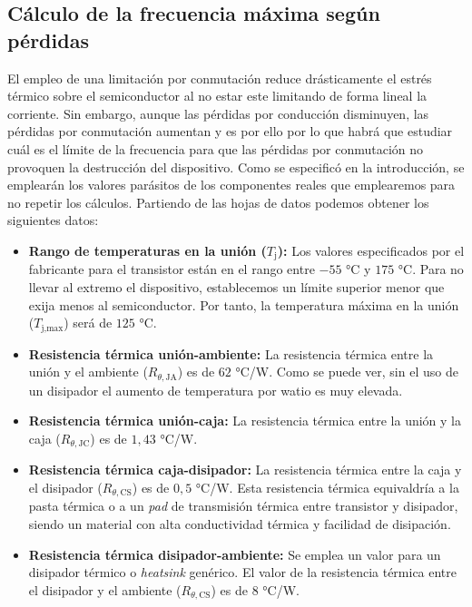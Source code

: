\documentclass[12pt]{report} %
\begin{document}
\subsection{Cálculo de la frecuencia máxima según pérdidas}
El empleo de una limitación por conmutación reduce drásticamente el estrés térmico sobre el semiconductor al no estar este limitando de forma lineal la corriente. Sin embargo, aunque las pérdidas por conducción disminuyen, las pérdidas por conmutación aumentan y es por ello por lo que habrá que estudiar cuál es el límite de la frecuencia para que las pérdidas por conmutación no provoquen la destrucción del dispositivo. Como se especificó en la introducción, se emplearán los valores parásitos de los componentes reales que emplearemos para no repetir los cálculos. 
Partiendo de las hojas de datos podemos obtener los siguientes datos:
\begin{itemize}
    \item \textbf{Rango de temperaturas en la unión ($T_\text{j}$):} Los valores especificados por el fabricante para el transistor están en el rango entre $-55$ °C y $175$ °C. Para no llevar al extremo el dispositivo, establecemos un límite superior menor que exija menos al semiconductor. Por tanto, la temperatura máxima en la unión ($T_\text{j,max}$) será de $125$ °C.
    \item \textbf{Resistencia térmica unión-ambiente:} La resistencia térmica entre la unión y el ambiente ($R_{\theta,\text{JA}}$) es de $62$ °C/W. Como se puede ver, sin el uso de un disipador el aumento de temperatura por watio es muy elevada. 
    \item \textbf{Resistencia térmica unión-caja:} La resistencia térmica entre la unión y la caja ($R_{\theta,\text{JC}}$) es de $1{,}43$ °C/W.
    \item \textbf{Resistencia térmica caja-disipador:} La resistencia térmica entre la caja y el disipador ($R_{\theta,\text{CS}}$) es de $0{,}5$ °C/W. Esta resistencia térmica equivaldría a la pasta térmica o a un \textit{pad} de transmisión térmica entre transistor y disipador, siendo un material con alta conductividad térmica y facilidad de disipación.
    \item \textbf{Resistencia térmica disipador-ambiente:} Se emplea un valor para un disipador térmico o \textit{heatsink} genérico. El valor de la resistencia térmica entre el disipador y el ambiente ($R_{\theta,\text{CS}}$) es de $8$ °C/W. 
\end{itemize}
\end{document}
